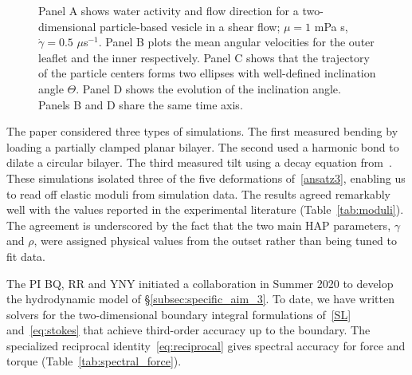 \begin{figure}
  \vspace{-25pt}
  \caption{\label{fig:tank_treading} \footnotesize
    Panel A shows water activity and flow direction for  a two-dimensional
    particle-based vesicle in a shear flow; $\mu  = 1$ mPa s,
    $\dot{\gamma} = 0.5$ $\mu$s$^{-1}$. Panel B plots the
    mean angular velocities for the outer leaflet and the inner
    respectively.  Panel C shows that the trajectory of the particle
    centers forms two ellipses with well-defined inclination angle
    $\Theta$. Panel D shows the evolution of the inclination angle.
    Panels B and D share the same time axis.}
\end{figure}
The paper \cite{Fu2018_SIAM} considered three types of simulations. The first measured bending by
loading a partially clamped planar bilayer. The second used a harmonic
bond to dilate a circular bilayer. The third measured tilt using a decay
equation from~\cite{KUZMIN2005}. These simulations isolated three of the
five deformations of~\eqref{ansatz3}, enabling us to read off elastic
moduli from simulation data. The results agreed remarkably well with the
values reported in the experimental literature (Table~\ref{tab:moduli}).
The agreement is underscored by the fact that the two main HAP
parameters, $\gamma$ and $\rho$, were assigned physical values from the
outset rather than being tuned to fit data. 

The PI BQ, RR and YNY initiated a collaboration in Summer 2020 to
develop the hydrodynamic model of \S\ref{subsec:specific_aim_3}.  To
date, we have written solvers for the two-dimensional boundary integral
formulations of~\eqref{SL} and~\eqref{eq:stokes} that achieve
third-order accuracy up to the boundary. The specialized reciprocal
identity~\eqref{eq:reciprocal} gives spectral accuracy for force and
torque (Table~\ref{tab:spectral_force}).

